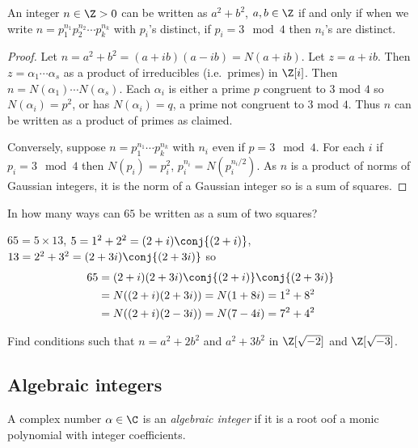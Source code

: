 \documentclass[a4paper]{article}
\theoremstyle{definition}
\begin{document}
\begin{corollary}
  An integer \(n \in \Z > 0\) can be written as \(a^2 + b^2\), \(a, b \in \Z\) if and only if when we write \(n = p_1^{n_1}p_2^{n_2}\cdots p_k^{n_k}\) with \(p_i\)'s distinct, if \(p_i = 3 \mod 4\) then \(n_i\)'s are distinct.
\end{corollary}

\begin{proof}
  Let \(n = a^2 + b^2 = (a + ib)(a - ib) = N(a + ib)\). Let \(z = a + ib\). Then \(z = \alpha_1\cdots \alpha_s\) as a product of irreducibles (i.e.\ primes) in \(\Z[i]\). Then \(n = N(\alpha_1)\cdots N(\alpha_s)\). Each \(\alpha_i\) is either a prime \(p\) congruent to \(3\) mod \(4\) so \(N(\alpha_i) = p^2\), or has \(N(\alpha_i) = q\), a prime not congruent to \(3\) mod \(4\). Thus \(n\) can be written as a product of primes as claimed.

  Conversely, suppose \(n = p_1^{n_1} \cdots p_k^{n_k}\) with \(n_i\) even if \(p = 3 \mod 4\). For each \(i\) if \(p_i = 3 \mod 4\) then \(N(p_i) = p_i^2\), \(p_i^{n_i} = N(p_i^{n_i/2})\). As \(n\) is a product of norms of Gaussian integers, it is the norm of a Gaussian integer so is a sum of squares.
\end{proof}

\begin{eg}
  In how many ways can \(65\) be written as a sum of two squares?
  
  \(65 = 5 \times 13\), \(5 = 1^2 + 2^2 = (2 + i) \conj{(2 + i)}\), \(13 = 2^2 + 3^2 = (2 + 3i)\conj{(2 + 3i)}\) so
    \begin{align*}
      65 &= (2 + i)(2 + 3i)\conj{(2 + i)}\conj{(2 + 3i)} \\
         &= N((2 + i)(2 + 3i)) = N(1 + 8i) = 1^2 + 8^2 \\
         &= N((2 + i)(2 - 3i)) = N(7 - 4i) = 7^2 + 4^2
    \end{align*}
\end{eg}

\begin{ex}[Challenge]
  Find conditions such that \(n = a^2 + 2b^2\) and \(a^2 + 3b^2\) in \(\Z[\sqrt{-2}]\) and \(\Z[\sqrt{-3}]\).
\end{ex}

\subsection{Algebraic integers}

\begin{definition}
  A complex number \(\alpha \in \C\) is an \emph{algebraic integer} if it is a root oof a monic polynomial with integer coefficients.
\end{definition}
\end{document}
